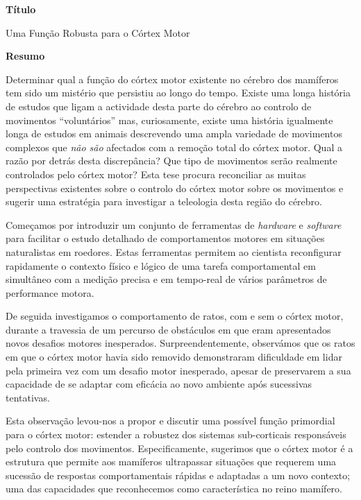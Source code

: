 \label{ch:abstractPT}


\begin{center}
\Large \textbf{T\'{i}tulo}
\end{center}

Uma Função Robusta para o Córtex Motor

\begin{center}
\Large \textbf{Resumo}
\end{center}

Determinar qual a função do córtex motor existente no cérebro dos mamíferos tem sido um mistério que persistiu ao longo do tempo. Existe uma longa história de estudos que ligam a actividade desta parte do cérebro ao controlo de movimentos ``voluntários'' mas, curiosamente, existe uma história igualmente longa de estudos em animais descrevendo uma ampla variedade de movimentos complexos que \emph{não são} afectados com a remoção total do córtex motor. Qual a razão por detrás desta discrepância? Que tipo de movimentos serão realmente controlados pelo córtex motor? Esta tese procura reconciliar as muitas perspectivas existentes sobre o controlo do córtex motor sobre os movimentos e sugerir uma estratégia para investigar a teleologia desta região do cérebro.

Começamos por introduzir um conjunto de ferramentas de \emph{hardware} e \emph{software} para facilitar o estudo detalhado de comportamentos motores em situações naturalistas em roedores. Estas ferramentas permitem ao cientista reconfigurar rapidamente o contexto físico e lógico de uma tarefa comportamental em simultâneo com a medição precisa e em tempo-real de vários parâmetros de performance motora.

De seguida investigamos o comportamento de ratos, com e sem o córtex motor, durante a travessia de um percurso de obstáculos em que eram apresentados novos desafios motores inesperados. Surpreendentemente, observámos que os ratos em que o córtex motor havia sido removido demonstraram dificuldade em lidar pela primeira vez com um desafio motor inesperado, apesar de preservarem a sua capacidade de se adaptar com eficácia ao novo ambiente após sucessivas tentativas.

Esta observação levou-nos a propor e discutir uma possível função primordial para o córtex motor: estender a robustez dos sistemas sub-corticais responsáveis pelo controlo dos movimentos. Especificamente, sugerimos que o córtex motor é a estrutura que permite aos mamíferos ultrapassar situações que requerem uma sucessão de respostas comportamentais rápidas e adaptadas a um novo contexto; uma das capacidades que reconhecemos como característica no reino mamífero.
